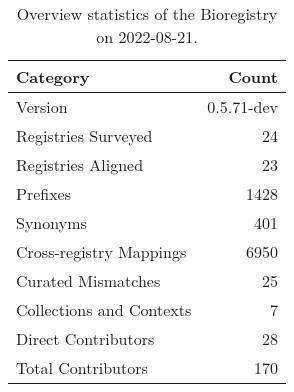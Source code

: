 \begin{table}
\centering
\caption{Overview statistics of the Bioregistry on 2022-08-21.}
\label{tab:bioregistry-summary}
\begin{tabular}{lr}
\toprule
                Category &      Count \\
\midrule
                 Version & 0.5.71-dev \\
     Registries Surveyed &         24 \\
      Registries Aligned &         23 \\
                Prefixes &       1428 \\
                Synonyms &        401 \\
 Cross-registry Mappings &       6950 \\
      Curated Mismatches &         25 \\
Collections and Contexts &          7 \\
     Direct Contributors &         28 \\
      Total Contributors &        170 \\
\bottomrule
\end{tabular}
\end{table}
